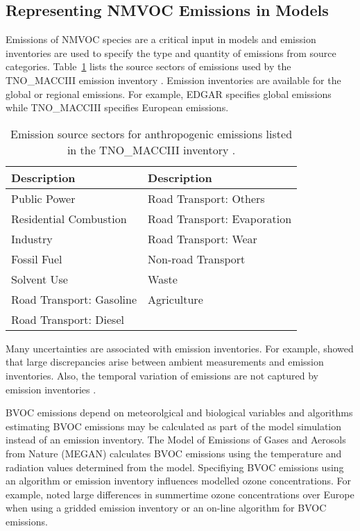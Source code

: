 \subsection{Representing NMVOC Emissions in Models}
Emissions of NMVOC species are a critical input in models and emission inventories are used to specify the type and quantity of emissions from source categories.
Table~\ref{t:SNAP} lists the source sectors of emissions used by the TNO\_MACCIII emission inventory \citep{Kuenen:2014}.
Emission inventories are available for the global or regional emissions.
For example, EDGAR \citep{Olivier:2001} specifies global emissions while TNO\_MACCIII \citep{Kuenen:2014} specifies European emissions.
\begin{table}[t]%
    \centering%
    \caption[Emission source sectors in the TNO\_MACCIII]{Emission source sectors for anthropogenic emissions listed in the TNO\_MACCIII inventory \citep{Kuenen:2014}.}%
    \begin{tabular}{ll}%
        \hline \hline
        \textbf{Description} & \textbf{Description} \\
        \hline \hline
        Public Power & Road Transport: Others \\
        Residential Combustion & Road Transport: Evaporation \\
        Industry & Road Transport: Wear \\
        Fossil Fuel & Non-road Transport \\
        Solvent Use & Waste \\
        Road Transport: Gasoline & Agriculture \\
        Road Transport: Diesel & \\ 
        \hline \hline
    \end{tabular}%
    \label{t:SNAP}%
\end{table}%

Many uncertainties are associated with emission inventories.
For example, \citet{Coll:2010} showed that large discrepancies arise between ambient measurements and emission inventories.
Also, the temporal variation of emissions are not captured by emission inventories \citep{Boynard:2014}. 

BVOC emissions depend on meteorolgical and biological variables and algorithms estimating BVOC emissions may be calculated as part of the model simulation instead of an emission inventory.
The Model of Emissions of Gases and Aerosols from Nature (MEGAN) \citep{Guenther:2006, Guenther:2012} calculates BVOC emissions using the temperature and radiation values determined from the model.
Specifiying BVOC emissions using an algorithm or emission inventory influences modelled ozone concentrations. 
For example, \citet{Curci:2009} noted large differences in summertime ozone concentrations over Europe when using a gridded emission inventory or an on-line algorithm for BVOC emissions.

